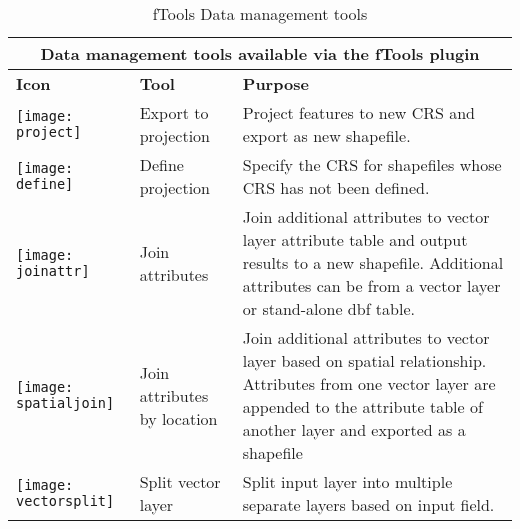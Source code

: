 \begin{table}[ht]
\centering
\caption{fTools Data management tools}\label{tab:fTool_data_management}\medskip
 \begin{tabular}{|p{0.3in}|p{1.3in}|p{4.6in}|}
 \hline \multicolumn{3}{|c|}{\textbf{Data management tools available via the fTools plugin}} \\
 \hline \textbf{Icon} & \textbf{Tool} & \textbf{Purpose} \\
 \hline \texttt{[image: project]} & Export to projection & 
Project features to new CRS and export as new shapefile. \\
 \hline \texttt{[image: define]} & Define projection & 
Specify the CRS for shapefiles whose CRS has not been defined. \\
 \hline \texttt{[image: joinattr]} & Join attributes & Join 
additional attributes to vector layer attribute table and output results 
to a new shapefile. Additional attributes can be from a vector layer or 
stand-alone dbf table. \\
 \hline \texttt{[image: spatialjoin]} & Join attributes by 
location & Join additional attributes to vector layer based on spatial 
relationship. Attributes from one vector layer are appended to the attribute 
table of another layer and exported as a shapefile \\
 \hline \texttt{[image: vectorsplit]} & Split vector layer & 
Split input layer into multiple separate layers based on input field. \\
 \hline
\end{tabular}
\end{table}



